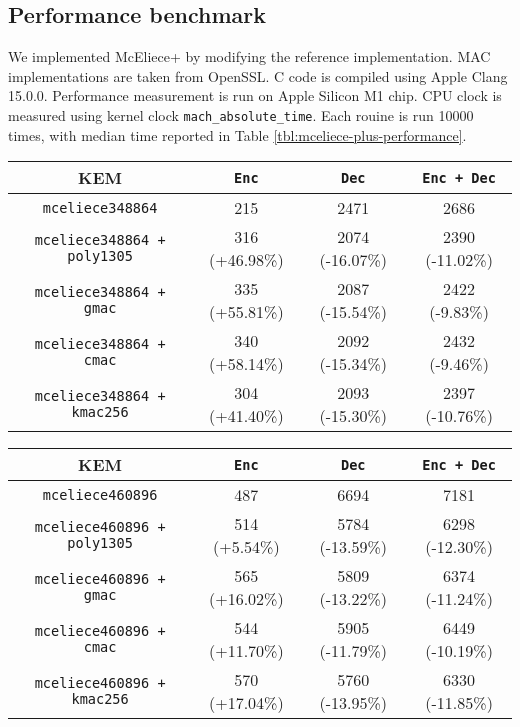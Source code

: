 \documentclass[runningheads]{llncs}
\begin{document}
\subsection{Performance benchmark}
We implemented McEliece+ by modifying the reference implementation. MAC implementations are taken from OpenSSL. C code is compiled using Apple Clang 15.0.0. Performance measurement is run on Apple Silicon M1 chip. CPU clock is measured using kernel clock \texttt{mach\_absolute\_time}. Each rouine is run 10000 times, with median time reported in Table \ref{tbl:mceliece-plus-performance}.

\begin{table}[h]
    \centering
    \begin{tabular}[c]{|c|c|c|c|}
        \hline
        KEM & \texttt{Enc} & \texttt{Dec} & \texttt{Enc + Dec} \\
        \hline
        \texttt{mceliece348864} & 215 & 2471 & 2686 \\
        \hline
        \texttt{mceliece348864 + poly1305} & 316 (+46.98\%) & 2074 (-16.07\%) & 2390 (-11.02\%) \\
        \hline
        \texttt{mceliece348864 + gmac} & 335 (+55.81\%) & 2087 (-15.54\%) & 2422 (-9.83\%) \\
        \hline
        \texttt{mceliece348864 + cmac} & 340 (+58.14\%) & 2092 (-15.34\%) & 2432 (-9.46\%) \\
        \hline
        \texttt{mceliece348864 + kmac256} & 304 (+41.40\%) & 2093 (-15.30\%) & 2397 (-10.76\%) \\
        \hline
    \end{tabular}\vspace{1em}
    \begin{tabular}[c]{|c|c|c|c|}
        \hline
        KEM & \texttt{Enc} & \texttt{Dec} & \texttt{Enc + Dec} \\
        \hline
        \texttt{mceliece460896} & 487 & 6694 & 7181 \\
        \hline
        \texttt{mceliece460896 + poly1305} & 514 (+5.54\%) & 5784 (-13.59\%) & 6298 (-12.30\%) \\
        \hline
        \texttt{mceliece460896 + gmac} & 565 (+16.02\%) & 5809 (-13.22\%) & 6374 (-11.24\%) \\
        \hline
        \texttt{mceliece460896 + cmac} & 544 (+11.70\%) & 5905 (-11.79\%) & 6449 (-10.19\%) \\
        \hline
        \texttt{mceliece460896 + kmac256} & 570 (+17.04\%) & 5760 (-13.95\%) & 6330 (-11.85\%) \\

\end{tabular}
\end{table}
\end{document}
